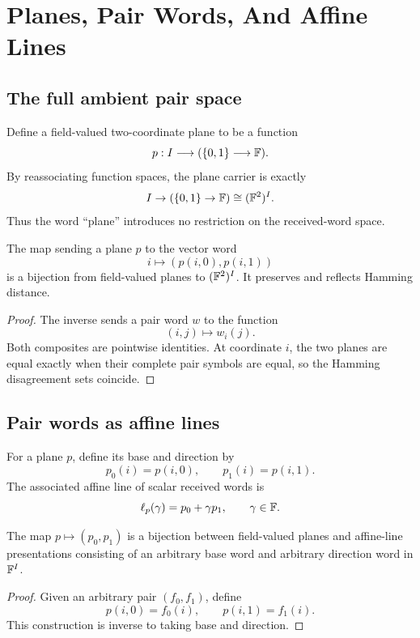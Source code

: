 \section{Planes, Pair Words, And Affine Lines}

\subsection{The full ambient pair space}

Define a field-valued two-coordinate plane to be a function
\[
  p:I\longrightarrow(\{0,1\}\longrightarrow\mathbb{F}).
\]
By reassociating function spaces, the plane carrier is exactly
\[
  I\to(\{0,1\}\to\mathbb{F})
  \cong
  (\mathbb{F}^2)^I.
\]
Thus the word ``plane'' introduces no restriction on the received-word space.

\begin{proposition}
\label{prop:plane-pair-equivalence}
The map sending a plane \(p\) to the vector word
\[
  i\longmapsto(p(i,0),p(i,1))
\]
is a bijection from field-valued planes to \((\mathbb{F}^2)^I\).  It preserves and
reflects Hamming distance.
\end{proposition}

\begin{proof}
The inverse sends a pair word \(w\) to the function
\[
  (i,j)\longmapsto w_i(j).
\]
Both composites are pointwise identities.  At coordinate \(i\), the two planes
are equal exactly when their complete pair symbols are equal, so the Hamming
disagreement sets coincide.
\end{proof}

\subsection{Pair words as affine lines}

For a plane \(p\), define its base and direction by
\[
  p_0(i)=p(i,0),
  \qquad
  p_1(i)=p(i,1).
\]
The associated affine line of scalar received words is
\[
  \ell_p(\gamma)=p_0+\gamma p_1,
  \qquad \gamma\in\mathbb{F}.
\]

\begin{proposition}
\label{prop:plane-line-equivalence}
The map \(p\mapsto(p_0,p_1)\) is a bijection between field-valued planes and
affine-line presentations consisting of an arbitrary base word and arbitrary
direction word in \(\mathbb{F}^I\).
\end{proposition}

\begin{proof}
Given an arbitrary pair \((f_0,f_1)\), define
\[
  p(i,0)=f_0(i),\qquad p(i,1)=f_1(i).
\]
This construction is inverse to taking base and direction.
\end{proof}


